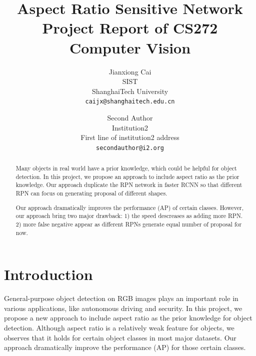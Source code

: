 \documentclass[10pt,twocolumn,letterpaper]{article}
\begin{document}
\title{Aspect Ratio Sensitive Network \\ 
\small Project Report of CS272 Computer Vision
}

\author{Jianxiong Cai\\
SIST \\
ShanghaiTech University\\
{\tt\small caijx@shanghaitech.edu.cn}
\and
Second Author\\
Institution2\\
First line of institution2 address\\
{\tt\small secondauthor@i2.org}
}

\maketitle

\begin{abstract}
\par
Many objects in real world have a prior knowledge, which could be helpful for object detection. In this project, we propose an approach to include aspect ratio as the prior knowledge. Our approach duplicate the RPN network in faster RCNN \cite{fasterRCNN} so that different RPN can focus on generating proposal of different shapes.
\par
Our approach dramatically improves the performance (AP) of certain classes. However, our approach bring two major drawback: 1) the speed descreases as adding more RPN. 2) more false negative appear as different RPNs generate equal number of proposal for now.

\end{abstract}

\section{Introduction}
\par
General-purpose object detection on RGB images plays an important role in various applications, like autonomous driving and security. In this project, we propose a new approach to include aspect ratio as the prior knowledge for object detection. Although aspect ratio is a relatively weak feature for objects, we observes that it holds for certain object classes in most major datasets. Our approach dramatically improve the performance (AP) for those certain classes.
\end{document}
